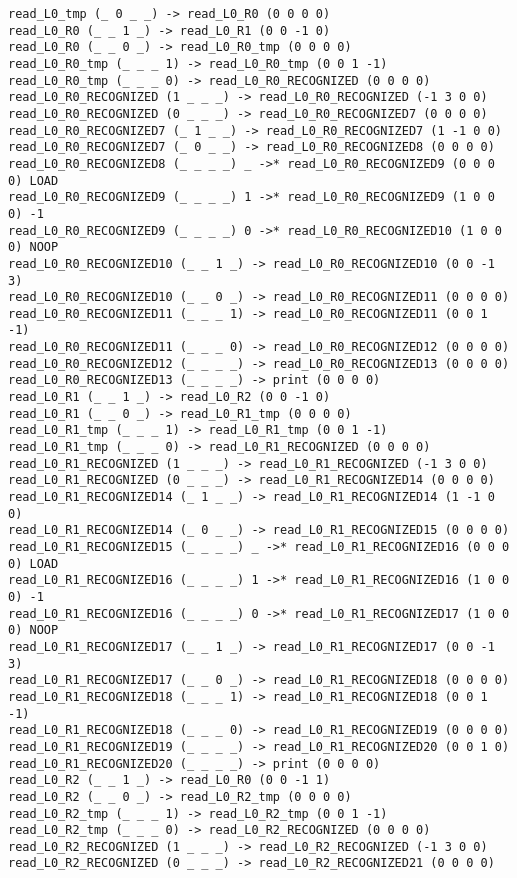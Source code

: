 \documentclass[english,shortabstract,mgr]{iithesis}
\begin{document}
\begin{verbatim}
read_L0_tmp (_ 0 _ _) -> read_L0_R0 (0 0 0 0)
read_L0_R0 (_ _ 1 _) -> read_L0_R1 (0 0 -1 0)
read_L0_R0 (_ _ 0 _) -> read_L0_R0_tmp (0 0 0 0)
read_L0_R0_tmp (_ _ _ 1) -> read_L0_R0_tmp (0 0 1 -1)
read_L0_R0_tmp (_ _ _ 0) -> read_L0_R0_RECOGNIZED (0 0 0 0)
read_L0_R0_RECOGNIZED (1 _ _ _) -> read_L0_R0_RECOGNIZED (-1 3 0 0)
read_L0_R0_RECOGNIZED (0 _ _ _) -> read_L0_R0_RECOGNIZED7 (0 0 0 0)
read_L0_R0_RECOGNIZED7 (_ 1 _ _) -> read_L0_R0_RECOGNIZED7 (1 -1 0 0)
read_L0_R0_RECOGNIZED7 (_ 0 _ _) -> read_L0_R0_RECOGNIZED8 (0 0 0 0)
read_L0_R0_RECOGNIZED8 (_ _ _ _) _ ->* read_L0_R0_RECOGNIZED9 (0 0 0 0) LOAD
read_L0_R0_RECOGNIZED9 (_ _ _ _) 1 ->* read_L0_R0_RECOGNIZED9 (1 0 0 0) -1
read_L0_R0_RECOGNIZED9 (_ _ _ _) 0 ->* read_L0_R0_RECOGNIZED10 (1 0 0 0) NOOP
read_L0_R0_RECOGNIZED10 (_ _ 1 _) -> read_L0_R0_RECOGNIZED10 (0 0 -1 3)
read_L0_R0_RECOGNIZED10 (_ _ 0 _) -> read_L0_R0_RECOGNIZED11 (0 0 0 0)
read_L0_R0_RECOGNIZED11 (_ _ _ 1) -> read_L0_R0_RECOGNIZED11 (0 0 1 -1)
read_L0_R0_RECOGNIZED11 (_ _ _ 0) -> read_L0_R0_RECOGNIZED12 (0 0 0 0)
read_L0_R0_RECOGNIZED12 (_ _ _ _) -> read_L0_R0_RECOGNIZED13 (0 0 0 0)
read_L0_R0_RECOGNIZED13 (_ _ _ _) -> print (0 0 0 0)
read_L0_R1 (_ _ 1 _) -> read_L0_R2 (0 0 -1 0)
read_L0_R1 (_ _ 0 _) -> read_L0_R1_tmp (0 0 0 0)
read_L0_R1_tmp (_ _ _ 1) -> read_L0_R1_tmp (0 0 1 -1)
read_L0_R1_tmp (_ _ _ 0) -> read_L0_R1_RECOGNIZED (0 0 0 0)
read_L0_R1_RECOGNIZED (1 _ _ _) -> read_L0_R1_RECOGNIZED (-1 3 0 0)
read_L0_R1_RECOGNIZED (0 _ _ _) -> read_L0_R1_RECOGNIZED14 (0 0 0 0)
read_L0_R1_RECOGNIZED14 (_ 1 _ _) -> read_L0_R1_RECOGNIZED14 (1 -1 0 0)
read_L0_R1_RECOGNIZED14 (_ 0 _ _) -> read_L0_R1_RECOGNIZED15 (0 0 0 0)
read_L0_R1_RECOGNIZED15 (_ _ _ _) _ ->* read_L0_R1_RECOGNIZED16 (0 0 0 0) LOAD
read_L0_R1_RECOGNIZED16 (_ _ _ _) 1 ->* read_L0_R1_RECOGNIZED16 (1 0 0 0) -1
read_L0_R1_RECOGNIZED16 (_ _ _ _) 0 ->* read_L0_R1_RECOGNIZED17 (1 0 0 0) NOOP
read_L0_R1_RECOGNIZED17 (_ _ 1 _) -> read_L0_R1_RECOGNIZED17 (0 0 -1 3)
read_L0_R1_RECOGNIZED17 (_ _ 0 _) -> read_L0_R1_RECOGNIZED18 (0 0 0 0)
read_L0_R1_RECOGNIZED18 (_ _ _ 1) -> read_L0_R1_RECOGNIZED18 (0 0 1 -1)
read_L0_R1_RECOGNIZED18 (_ _ _ 0) -> read_L0_R1_RECOGNIZED19 (0 0 0 0)
read_L0_R1_RECOGNIZED19 (_ _ _ _) -> read_L0_R1_RECOGNIZED20 (0 0 1 0)
read_L0_R1_RECOGNIZED20 (_ _ _ _) -> print (0 0 0 0)
read_L0_R2 (_ _ 1 _) -> read_L0_R0 (0 0 -1 1)
read_L0_R2 (_ _ 0 _) -> read_L0_R2_tmp (0 0 0 0)
read_L0_R2_tmp (_ _ _ 1) -> read_L0_R2_tmp (0 0 1 -1)
read_L0_R2_tmp (_ _ _ 0) -> read_L0_R2_RECOGNIZED (0 0 0 0)
read_L0_R2_RECOGNIZED (1 _ _ _) -> read_L0_R2_RECOGNIZED (-1 3 0 0)
read_L0_R2_RECOGNIZED (0 _ _ _) -> read_L0_R2_RECOGNIZED21 (0 0 0 0)

\end{verbatim}
\end{document}
